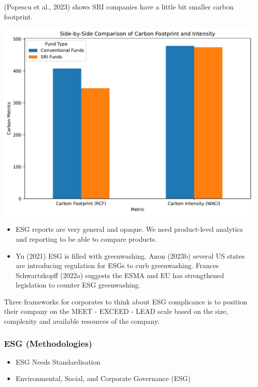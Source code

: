 \documentclass[
  letterpaper,
  DIV=11,
  numbers=noendperiod]{scrartcl}
\providecommand{\tightlist}{%
  \setlength{\itemsep}{0pt}\setlength{\parskip}{0pt}}\usepackage{longtable,booktabs,array}
\begin{document}
(Popescu et al., 2023) shows SRI companies have a little bit smaller
carbon footprint.

\includegraphics{_thesis_files/figure-pdf/cell-60-output-1.pdf}

\begin{itemize}
\item
  ESG reports are very general and opaque. We need product-level
  analytics and reporting to be able to compare products.
\item
  Yu (2021) ESG is filled with greenwashing. Anon (2023b) several US
  states are introducing regulation for ESGs to curb greenwashing.
  Frances Schwartzkopff (2022a) suggests the ESMA and EU has
  strengthened legislation to counter ESG greenwashing.
\end{itemize}

Three frameworks for corporates to think about ESG complicance is to
position their company on the MEET - EXCEED - LEAD scale based on the
size, complexity and available resources of the company.

\subsubsection{ESG (Methodologies)}\label{esg-methodologies}

\begin{itemize}
\tightlist
\item
  ESG Needs Standardisation
\item
  Environmental, Social, and Corporate Governance (ESG)
\end{itemize}
\end{document}
